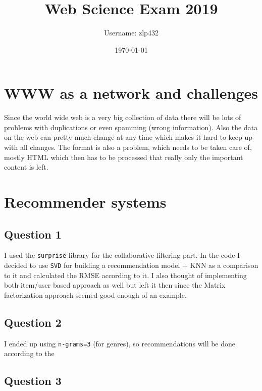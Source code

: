 \documentclass[11pt,a4paper]{article}
\begin{document}
\title{Web Science Exam 2019}

\author{Username: zlp432}
\date{\today}
	
\maketitle
\tableofcontents

\section{WWW as a network and challenges}

Since the world wide web is a very big collection of data there will be lots of problems with duplications or even spamming (wrong information).
Also the data on the web can pretty much change at any time which makes it hard to keep up with all changes. 
The format is also a problem, which needs to be taken care of, mostly HTML which then has to be processed that really only the important content is left.


\section{Recommender systems}

\subsection{Question 1}
I used the \texttt{surprise} library for the collaborative filtering part.
In the code I decided to use \texttt{SVD} for building a recommendation model + KNN as a comparison to it and calculated the RMSE according to it.
I also thought of implementing both item/user based approach as well but left it then since the Matrix factorization approach seemed good enough of an example.

\subsection{Question 2}
I ended up using \texttt{n-grams=3} (for genres), so recommendations will be done according to the

\subsection{Question 3}
\end{document}
